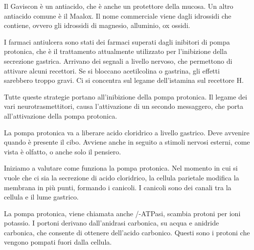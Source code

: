 Il Gaviscon è un antiacido, che è anche un protettore della mucosa.
Un altro antiacido comune è il Maalox. Il nome commerciale viene dagli
idrossidi che contiene, ovvero gli idrossidi di magnesio, alluminio, ox
ossidi.


I farmaci antiulcera sono stati dei farmaci superati dagli inibitori di
pompa protonica, che è il trattamento attualmente utilizzato per
l'inibizione della secrezione gastrica.
Arrivano dei segnali a livello nervoso, che permettono di attivare
alcuni recettori. Se si bloccano acetilcolina o gastrina, gli effetti
sarebbero troppo gravi. Ci si concentra sul legame dell'istamina sul
recettore H.


Tutte queste strategie portano all'inibizione della pompa protonica. Il
legame dei vari neurotrasmettitori, causa l'attivazione di un secondo
messaggero, che porta all'attivazione della pompa protonica.

La pompa protonica va a liberare acido cloridrico a livello gastrico.
Deve avvenire quando è presente il cibo. Avviene anche in seguito a
stimoli nervosi esterni, come vista è olfatto, o anche solo il pensiero.


Iniziamo a valutare come funziona la pompa protonica.
Nel momento in cui si vuole che ci sia la secrezione di acido
cloridrico, la cellula parietale modifica la membrana in più punti,
formando i canicoli. I canicoli sono dei canali tra la cellula e il lume
gastrico.

La pompa protonica, viene chiamata anche /-ATPasi, scambia
protoni per ioni potassio. I portoni derivano dall'anidrasi carbonica,
su acqua e anidride carbonica, che consente di ottenere dell'acido
carbonico. Questi sono i protoni che vengono pompati fuori dalla
cellula.

